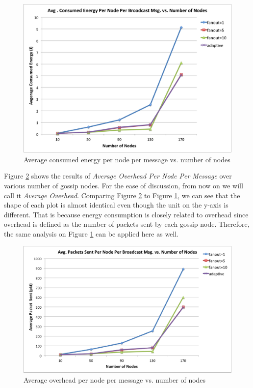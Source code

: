 \documentclass[onehalf,11pt]{beavtex}
\newcommand{\gn}{gossip node}
\newcommand{\gns}{gossip nodes}
\newcommand{\ao}{Average Overhead}
\begin{document}
\begin{figure} 
	\centering
	\includegraphics[width=5.5in]{energy.png}
	\caption{Average consumed energy per node per message vs. number of nodes}
	\label{fig:energy}
\end{figure}

Figure \ref{fig:overhead} shows the results of \emph{Average Overhead Per Node Per Message} over various number of \gns. For the ease of discussion, from now on we will call it \emph{\ao}. Comparing Figure \ref{fig:overhead} to Figure \ref{fig:energy}, we can see that the shape of each plot is almost identical even though the unit on the y-axis is different. That is because energy consumption is closely related to overhead since overhead is defined as the number of packets sent by each \gn. Therefore, the same analysis on Figure \ref{fig:energy} can be applied here as well.

\begin{figure} 
	\centering
	\includegraphics[width=5.5in]{overhead.png}
	\caption{Average overhead per node per message vs. number of nodes}
	\label{fig:overhead}
\end{figure}
\end{document}
